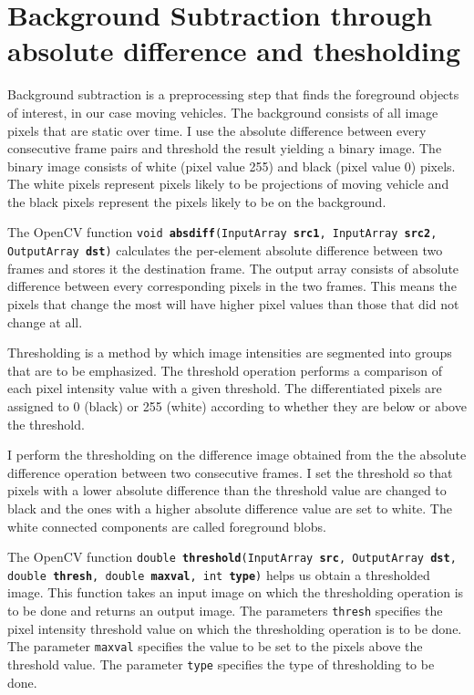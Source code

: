 \documentclass[a4paper]{aitthesis}
\begin{document}
\section{Background Subtraction through absolute difference and thesholding}
Background subtraction is a preprocessing step that finds the foreground objects of interest, in our case moving vehicles. The background consists of all image pixels that are static over time. I use the absolute difference between every consecutive frame pairs and threshold the result yielding a binary image. The binary image consists of white (pixel value 255) and black (pixel value 0) pixels.  The white pixels represent pixels likely to be projections of moving vehicle and the black pixels represent the pixels likely to be on the background.

The OpenCV function \texttt{void \textbf{absdiff}(InputArray \textbf{src1}, InputArray \textbf{src2}, \newline OutputArray \textbf{dst})} calculates the per-element absolute difference between two frames and stores it the destination frame. The output array consists of absolute difference between every corresponding pixels in the two frames. This means the pixels that change the most will have higher pixel values than those that did not change at all.

Thresholding is a method by which image intensities are segmented into groups that are to be emphasized. The threshold operation performs a comparison of each pixel intensity value with a given threshold. The differentiated pixels are assigned to 0 (black) or 255 (white) according to whether they are below or above the threshold.

I perform the thresholding on the difference image obtained from the the absolute difference operation between two consecutive frames. I set the threshold so that pixels with a lower absolute difference than the threshold value are changed to black and the ones with a higher absolute difference value are set to white. The white connected components are called foreground blobs.

The OpenCV function \texttt{double \textbf{threshold}(InputArray \textbf{src}, OutputArray \textbf{dst}, \newline double \textbf{thresh}, double \textbf{maxval}, int \textbf{type})} helps us obtain a thresholded image. This function takes an input image on which the thresholding operation is to be done and returns an output image. The parameters \texttt{thresh} specifies the pixel intensity threshold value on which the thresholding operation is to be done. The parameter \texttt{maxval} specifies the value to be set to the pixels above the threshold value. The parameter \texttt{type} specifies the type of thresholding to be done.
\end{document}
